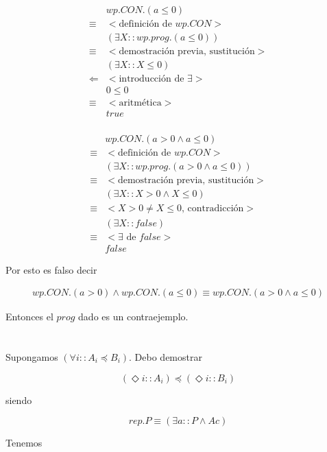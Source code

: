 \documentclass{article}
\begin{document}
\begin{align*}
 & wp.CON.(a \leq 0) \\
 \equiv & <\text{definición de } wp.CON> \\
 & (\exists X :: wp.prog.(a \leq 0)) \\
 \equiv & <\text{demostración previa, sustitución}> \\
 & (\exists X :: X \leq 0) \\
 \Leftarrow & <\text{introducción de } \exists> \\
 & 0 \leq 0 \\
 \equiv & <\text{aritmética}> \\
 & true \\
\end{align*}

\begin{align*}
 & wp.CON.(a > 0 \wedge a \leq 0) \\
 \equiv & <\text{definición de } wp.CON> \\
 & (\exists X :: wp.prog.(a > 0 \wedge a \leq 0)) \\
 \equiv & <\text{demostración previa, sustitución}> \\
 & (\exists X :: X > 0 \wedge X \leq 0) \\
 \equiv & <X > 0 \neq X \leq 0 \text{, contradicción}> \\
 & (\exists X :: false) \\
 \equiv & <\exists \text{ de } false> \\
 & false
\end{align*}

Por esto es falso decir

\begin{align*}
wp.CON.(a > 0) \wedge wp.CON.(a \leq 0) \equiv wp.CON.(a > 0 \wedge a \leq 0)
\end{align*}

Entonces el $prog$ dado es un contraejemplo.

\section{}

Supongamos $(\forall i :: A_i \preccurlyeq B_i)$. Debo demostrar

$$
(\Diamond i :: A_i) \preccurlyeq (\Diamond i :: B_i)
$$

siendo

$$
rep.P \equiv (\exists a :: P \wedge Ac)
$$

Tenemos
\end{document}
